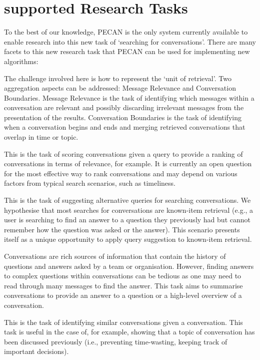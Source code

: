\section{supported Research Tasks}
\label{sec:importance}

To the best of our knowledge, PECAN is the only system currently available to enable research into this new task of `searching for conversations'. There are many facets to this new research task that PECAN can be used for implementing new algorithms:

\begin{description}[noitemsep,leftmargin=8pt]
\item[Conversation Aggregations:] The challenge involved here is how to represent the `unit of retrieval'. Two aggregation aspects can be addressed: Message Relevance and Conversation Boundaries. Message Relevance is the task of identifying which messages within a conversation are relevant and possibly discarding irrelevant messages from the presentation of the results. Conversation Boundaries is the task of identifying when a conversation begins and ends and merging retrieved conversations that overlap in time or topic.
\item[Conversation Scoring:] This is the task of scoring conversations given a query to provide a ranking of conversations in terms of relevance, for example. It is currently an open question for the most effective way to rank conversations and may depend on various factors from typical search scenarios, such as timeliness.
\item[Query Suggestion:] This is the task of suggesting alternative queries for searching conversations. We hypothesise that most searches for conversations are known-item retrieval (e.g., a user is searching to find an answer to a question they previously had but cannot remember how the question was asked or the answer). This scenario presents itself as a unique opportunity to apply query suggestion to known-item retrieval.
\item[Conversation Summarisation:] Conversations are rich sources of information that contain the history of questions and answers asked by a team or organisation. However, finding answers to complex questions within conversations can be tedious as one may need to read through many messages to find the answer. This task aims to summarise conversations to provide an answer to a question or a high-level overview of a conversation.
\item[Related Conversations:] This is the task of identifying similar conversations given a conversation. This task is useful in the case of, for example, showing that a topic of conversation has been discussed previously (i.e., preventing time-wasting, keeping track of important decisions).
\end{description}
 
 